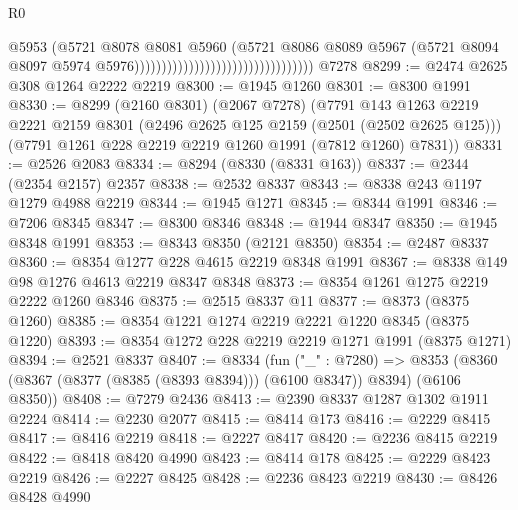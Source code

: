 \begin{lexlean}{R0}
\begin{coremodule}
                                                                @5953
                                                                (@5721
                                                                  @8078
                                                                  @8081
                                                                  @5960
                                                                  (@5721
                                                                    @8086
                                                                    @8089
                                                                    @5967
                                                                    (@5721
                                                                      @8094
                                                                      @8097
                                                                      @5974
                                                                      @5976)))))))))))))))))))))))))))))))))
    @7278
@8299 := @2474 @2625 @308 @1264 @2222 @2219
@8300 := @1945 @1260
@8301 := @8300 @1991
@8330 := @8299
    (@2160 @8301)
    (@2067 @7278)
    (@7791
      @143
      @1263
      @2219
      @2221
      @2159
      @8301
      (@2496 @2625 @125 @2159 (@2501 (@2502 @2625 @125)))
      (@7791 @1261 @228 @2219 @2219 @1260 @1991 (@7812 @1260) @7831))
@8331 := @2526 @2083
@8334 := @8294 (@8330 (@8331 @163))
@8337 := @2344 (@2354 @2157) @2357
@8338 := @2532 @8337
@8343 := @8338 @243 @1197 @1279 @4988 @2219
@8344 := @1945 @1271
@8345 := @8344 @1991
@8346 := @7206 @8345
@8347 := @8300 @8346
@8348 := @1944 @8347
@8350 := @1945 @8348 @1991
@8353 := @8343 @8350 (@2121 @8350)
@8354 := @2487 @8337
@8360 := @8354 @1277 @228 @4615 @2219 @8348 @1991
@8367 := @8338 @149 @98 @1276 @4613 @2219 @8347 @8348
@8373 := @8354 @1261 @1275 @2219 @2222 @1260 @8346
@8375 := @2515 @8337 @11
@8377 := @8373 (@8375 @1260)
@8385 := @8354 @1221 @1274 @2219 @2221 @1220 @8345 (@8375 @1220)
@8393 := @8354 @1272 @228 @2219 @2219 @1271 @1991 (@8375 @1271)
@8394 := @2521 @8337
@8407 := @8334
    (fun ("_" : @7280) =>
    @8353 (@8360 (@8367 (@8377 (@8385 (@8393 @8394))) (@6100 @8347)) @8394) (@6106 @8350))
@8408 := @7279 @2436
@8413 := @2390 @8337 @1287 @1302 @1911 @2224
@8414 := @2230 @2077
@8415 := @8414 @173
@8416 := @2229 @8415
@8417 := @8416 @2219
@8418 := @2227 @8417
@8420 := @2236 @8415 @2219
@8422 := @8418 @8420 @4990
@8423 := @8414 @178
@8425 := @2229 @8423 @2219
@8426 := @2227 @8425
@8428 := @2236 @8423 @2219
@8430 := @8426 @8428 @4990

\end{coremodule}
\end{lexlean}
